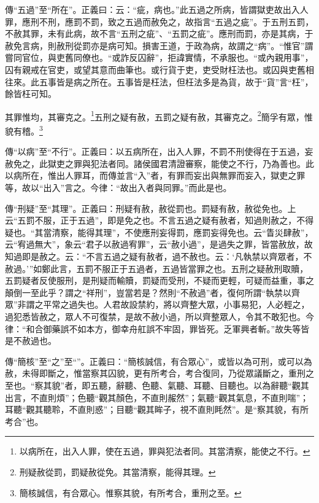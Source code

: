 {\noindent\zhuan{}\fzbyks 傳“五過”至“所在”。正義曰：云：“疵，病也。”此五過之所病，皆謂獄吏故出入人罪，應刑不刑，應罰不罰，致之五過而赦免之，故指言“五過之疵”。于五刑五罰，不赦其罪，未有此病，故不言“五刑之疵”、“五罰之疵”。應刑而罰，亦是其病，于赦免言病，則赦刑從罰亦是病可知。損害王道，于政為病，故謂之“病”。“惟官”謂嘗同官位，與吏舊同僚也。“或詐反囚辭”，拒諱實情，不承服也。“或內親用事”，囚有親戒在官吏，或望其意而曲筆也。或行貨于吏，吏受財枉法也。或囚與吏舊相往來。此五事皆是病之所在。五事皆是枉法，但枉法多是為貨，故于“貨”言“枉”，餘皆枉可知。 \par}

其罪惟均，其審克之。\footnote{以病所在，出入人罪，使在五過，罪與犯法者同。其當清察，能使之不行。}五刑之疑有赦，五罰之疑有赦，其審克之。\footnote{刑疑赦從罰，罰疑赦從免。其當清察，能得其理。}簡孚有眾，惟貌有稽。\footnote{簡核誠信，有合眾心。惟察其貌，有所考合，重刑之至。}


{\noindent\zhuan{}\fzbyks 傳“以病”至“不行”。正義曰：以五病所在，出入人罪，不罰不刑使得在于五過，妄赦免之，此獄吏之罪與犯法者同。諸侯國君清證審察，能使之不行，乃為善也。此以病所在，惟出人罪耳，而傳並言“入”者，有罪而妄出與無罪而妄入，獄吏之罪等，故以“出入”言之。今律：“故出入者與同罪。”而此是也。 \par}

{\noindent\zhuan{}\fzbyks 傳“刑疑”至“其理”。正義曰：刑疑有赦，赦從罰也。罰疑有赦，赦從免也。上云“五罰不服，正于五過”，即是免之也。不言五過之疑有赦者，知過則赦之，不得疑也。“其當清察，能得其理”，不使應刑妄得罰，應罰妄得免也。云“眚災肆赦”，云“宥過無大”，象云“君子以赦過宥罪”，云“赦小過”，是過失之罪，皆當赦放，故知過即是赦之。云：“不言五過之疑有赦者，過不赦也。云：‘凡執禁以齊眾者，不赦過。’”如鄭此言，五罰不服正于五過者，五過皆當罪之也。五刑之疑赦刑取贖，五罰疑者反使服刑，是刑疑而輸贖，罰疑而受刑，不疑而更輕，可疑而益重，事之顛倒一至此乎？謂之“祥刑”，豈當若是？然則“不赦過”者，復何所謂“執禁以齊眾”非謂之平常之過失也。人君故設禁約，將以齊整大眾，小事易犯，人必輕之，過犯悉皆赦之，眾人不可復禁，是故不赦小過，所以齊整眾人，令其不敢犯也。今律：“和合御藥誤不如本方，御幸舟舡誤不牢固，罪皆死。乏軍興者斬。”故失等皆是不赦過也。 \par}

{\noindent\zhuan{}\fzbyks 傳“簡核”至“之”至“”。正義曰：“簡核誠信，有合眾心”，或皆以為可刑，或可以為赦，未得即斷之，惟當察其囚貌，更有所考合，考合復同，乃從眾議斷之，重刑之至也。“察其貌”者，即五聽，辭聽、色聽、氣聽、耳聽、目聽也。以為辭聽“觀其出言，不直則煩”；色聽“觀其顏色，不直則赧然”；氣聽“觀其氣息，不直則喘”；耳聽“觀其聽聆，不直則惑”；目聽“觀其眸子，視不直則眊然”。是“察其貌，有所考合”也。 \par}

